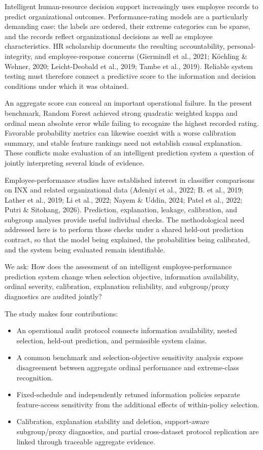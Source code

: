 \documentclass[
  a4paper,
  review]{elsarticle}
\providecommand{\tightlist}{%
  \setlength{\itemsep}{0pt}\setlength{\parskip}{0pt}}
\begin{document}
Intelligent human-resource decision support increasingly uses employee
records to predict organizational outcomes. Performance-rating models
are a particularly demanding case: the labels are ordered, their extreme
categories can be sparse, and the records reflect organizational
decisions as well as employee characteristics. HR scholarship documents
the resulting accountability, personal-integrity, and employee-response
concerns (Giermindl et al., 2021; Köchling \& Wehner, 2020;
Leicht-Deobald et al., 2019; Tambe et al., 2019). Reliable system
testing must therefore connect a predictive score to the information and
decision conditions under which it was obtained.

An aggregate score can conceal an important operational failure. In the
present benchmark, Random Forest achieved strong quadratic weighted
kappa and ordinal mean absolute error while failing to recognize the
highest recorded rating. Favorable probability metrics can likewise
coexist with a worse calibration summary, and stable feature rankings
need not establish causal explanation. These conflicts make evaluation
of an intelligent prediction system a question of jointly interpreting
several kinds of evidence.

Employee-performance studies have established interest in classifier
comparisons on INX and related organizational data (Adeniyi et al.,
2022; B. et al., 2019; Lather et al., 2019; Li et al., 2022; Nayem \&
Uddin, 2024; Patel et al., 2022; Putri \& Sitohang, 2026). Prediction,
explanation, leakage, calibration, and subgroup analyses provide useful
individual checks. The methodological need addressed here is to perform
those checks under a shared held-out prediction contract, so that the
model being explained, the probabilities being calibrated, and the
system being evaluated remain identifiable.

We ask: How does the assessment of an intelligent employee-performance
prediction system change when selection objective, information
availability, ordinal severity, calibration, explanation reliability,
and subgroup/proxy diagnostics are audited jointly?

The study makes four contributions:

\begin{itemize}
\tightlist
\item
  An operational audit protocol connects information availability,
  nested selection, held-out prediction, and permissible system claims.
\item
  A common benchmark and selection-objective sensitivity analysis expose
  disagreement between aggregate ordinal performance and extreme-class
  recognition.
\item
  Fixed-schedule and independently retuned information policies separate
  feature-access sensitivity from the additional effects of
  within-policy selection.
\item
  Calibration, explanation stability and deletion, support-aware
  subgroup/proxy diagnostics, and partial cross-dataset protocol
  replication are linked through traceable aggregate evidence.
\end{itemize}
\end{document}
